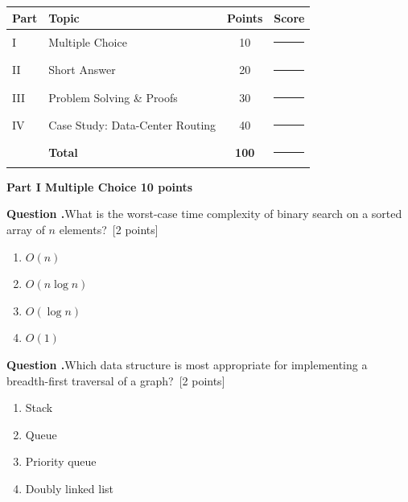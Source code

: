 \documentclass[11pt]{article}
\newif\ifshowsolutions
\newcommand{\examsection}[2]{%
  \par\vspace{3mm}%
  \noindent\colorbox{primary}{\parbox{\dimexpr\linewidth-2\fboxsep\relax}{\vspace{2pt}\color{white}\bfseries\large #1 \hfill \normalfont\normalsize #2\vspace{2pt}}}%
  \par\vspace{2mm}
}
\newcounter{qnum}
\newcommand{\question}[2]{%
  \par\vspace{2mm}
  \stepcounter{qnum}%
  \noindent\textbf{\color{primary}Question \theqnum.}\quad #2\ {\small\color{slate}[#1 points]}\par\vspace{1mm}
}
\newcommand{\mcqanswer}[2]{%
  \ifshowsolutions
    \begin{solbox}
      {\color{mint!55!black}\faCheck\ \textbf{Correct answer: (#1)}}\quad #2
    \end{solbox}
  \fi
}
\begin{document}
\vspace{1.5mm}
\begin{center}
\renewcommand{\arraystretch}{1.25}
\begin{tabular}{@{}l l c c@{}}
\toprule
\rowcolor{primary!10}
\textbf{Part} & \textbf{Topic} & \textbf{Points} & \textbf{Score} \\
\midrule
I & Multiple Choice & 10 & \ifshowsolutions --- \else \rule{1.4cm}{0.4pt} \fi \\
II & Short Answer & 20 & \ifshowsolutions --- \else \rule{1.4cm}{0.4pt} \fi \\
III & Problem Solving \& Proofs & 30 & \ifshowsolutions --- \else \rule{1.4cm}{0.4pt} \fi \\
IV & Case Study: Data-Center Routing & 40 & \ifshowsolutions --- \else \rule{1.4cm}{0.4pt} \fi \\
\midrule
\rowcolor{gold!12}
 & \textbf{Total} & \textbf{100} & \ifshowsolutions --- \else \rule{1.4cm}{0.4pt} \fi \\
\bottomrule
\end{tabular}
\end{center}

\examsection{Part I}{Multiple Choice \hfill 10 points}

\question{2}{What is the worst-case time complexity of binary search on a sorted array of $n$ elements?}
\begin{enumerate}[label=(\Alph*), itemsep=1pt, topsep=2pt, leftmargin=2.6em]
  \item $O(n)$
  \item $O(n \log n)$
  \item $O(\log n)$
  \item $O(1)$
\end{enumerate}
\mcqanswer{C}{Each comparison halves the remaining search space, giving $T(n) = T(n/2) + O(1)$, which solves to $O(\log n)$.}

\question{2}{Which data structure is most appropriate for implementing a breadth-first traversal of a graph?}
\begin{enumerate}[label=(\Alph*), itemsep=1pt, topsep=2pt, leftmargin=2.6em]
  \item Stack
  \item Queue
  \item Priority queue
  \item Doubly linked list
\end{enumerate}
\mcqanswer{B}{BFS visits nodes in the order they are discovered, which is exactly FIFO behavior --- a queue.}
\end{document}
